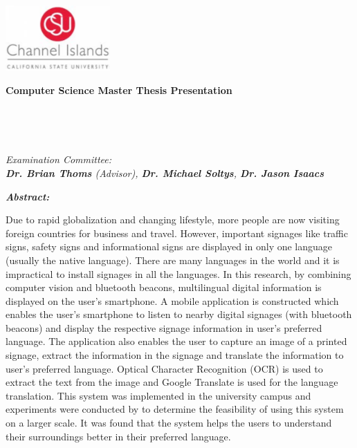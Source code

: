 \documentclass{article}
\begin{document}
\begin{center}

\includegraphics[width=0.3\textwidth]{media/ci-logo.png}\\

\hfill\break

\LARGE
\textbf{\color{grey}Computer Science Master Thesis Presentation}\\

\vspace{5mm}

\Large
{\bf \thesistitle}\\

\vspace{5mm}

\large
{\bf \studentname}\\

\vspace{5mm}

\large
\textit{ Examination Committee:\\
{\bf Dr. Brian Thoms} (Advisor), {\bf Dr. Michael Soltys}, {\bf
Dr. Jason Isaacs}}\\

\hfill\break

\end{center}

\begin{adjustwidth}{1in}{1in}
\textit{\bf Abstract:}\\

\vspace{3mm}

\normalsize
\noindent Due to rapid globalization and changing lifestyle, more people are now visiting foreign countries for business and travel. However, important signages like traffic signs, safety signs and informational signs are displayed in only one language (usually the native language). There are many languages in the world and it is impractical to install signages in all the languages. In this research, by combining computer vision and bluetooth beacons, multilingual digital information is displayed on the user's smartphone. A mobile application is constructed which enables the user's smartphone to listen to nearby digital signages (with bluetooth beacons) and display the respective signage information in user's preferred language. The application also enables the user to capture an image of a printed signage, extract the information in the signage and translate the information to user's preferred language. Optical Character Recognition (OCR) is used to extract the text from the image and Google Translate is used for the language translation. This system was implemented in the university campus and experiments were conducted by to determine the feasibility of using this system on a larger scale. It was found that the system helps the users to understand their surroundings better in their preferred language.
\end{adjustwidth}
\end{document}
